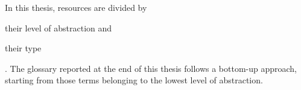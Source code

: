 In this thesis, resources are divided by
\begin{mylist}
    \item their level of abstraction and
    \item their type
\end{mylist}.
The glossary reported at the end of this thesis follows a bottom-up approach, starting from those terms belonging to the lowest level of abstraction.

\begin{comment}
    \begin{itemize}
        \item \textbf{Physical resources}:
        \label{gls:resource:physical}
        set of physical hardware component of limited availability within a computer system. 
        
        \begin{itemize}
            \item \textbf{Physical server resources}:
            \label{gls:resource:physical:server}
            resources of physical server machines.
            
            \item \textbf{Physical switch resources}:
            \label{gls:resource:physical:switch}
            resources of physical switches, network accelerators, middle-boxes and of every kind of network device originally intended to forward packets.
        \end{itemize}
        
        \item \textbf{Logical resources}:
        \label{gls:resource:logical}
        logical representation of physical resources.
        
        \begin{itemize}
            \item \textbf{Logical server resources}:
            \label{gls:resource:logical:server}
            virtualized server physical resources, often implemented by means of \glspl{vm}, containers or entire physical servers.
            
            \item \textbf{Logical switch resources}:
            \label{gls:resource:logical:switch}
            logical representation of physical switch resources not mapped to any physical switch device.
            
            \item \textbf{Logical edge resources}:
            \label{gls:resource:logical:edge}
            properties of virtual connections between logical resources, e.g., bandwidth, latency, etc.
        \end{itemize}
        

\end{comment}
